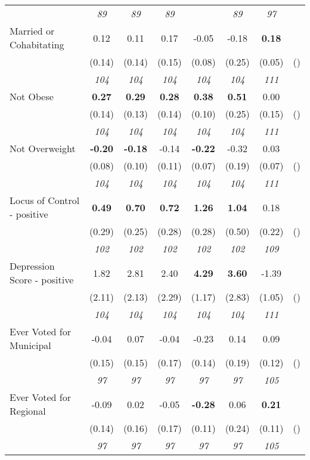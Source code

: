 \begin{tabular}{l c c c c c c c}
& \textit{ 89 } & \textit{ 89 } & \textit{ 89 } & & \textit{ 89 } & \textit{ 97 } & \\
Married or Cohabitating & 0.12 & 0.11 & 0.17 & -0.05 & -0.18 & \textbf{0.18} & \\
& (0.14) & (0.14) & (0.15) & (0.08) & (0.25) & (0.05) & () \\
& \textit{ 104 } & \textit{ 104 } & \textit{ 104 } & \textit{ 104 } & \textit{ 104 } & \textit{ 111 } & \\
Not Obese & \textbf{ 0.27 } & \textbf{ 0.29 } & \textbf{ 0.28 } & \textbf{0.38} & \textbf{0.51} & 0.00 & \\
& (0.14) & (0.13) & (0.14) & (0.10) & (0.25) & (0.15) & () \\
& \textit{ 104 } & \textit{ 104 } & \textit{ 104 } & \textit{ 104 } & \textit{ 104 } & \textit{ 111 } & \\
Not Overweight & \textbf{ -0.20 } & \textbf{ -0.18 } & -0.14 & \textbf{-0.22} & -0.32 & 0.03 & \\
& (0.08) & (0.10) & (0.11) & (0.07) & (0.19) & (0.07) & () \\
& \textit{ 104 } & \textit{ 104 } & \textit{ 104 } & \textit{ 104 } & \textit{ 104 } & \textit{ 111 } & \\
Locus of Control - positive & \textbf{ 0.49 } & \textbf{ 0.70 } & \textbf{ 0.72 } & \textbf{1.26} & \textbf{1.04} & 0.18 & \\
& (0.29) & (0.25) & (0.28) & (0.28) & (0.50) & (0.22) & () \\
& \textit{ 102 } & \textit{ 102 } & \textit{ 102 } & \textit{ 102 } & \textit{ 102 } & \textit{ 109 } & \\
Depression Score - positive & 1.82 & 2.81 & 2.40 & \textbf{4.29} & \textbf{3.60} & -1.39 & \\
& (2.11) & (2.13) & (2.29) & (1.17) & (2.83) & (1.05) & () \\
& \textit{ 104 } & \textit{ 104 } & \textit{ 104 } & \textit{ 104 } & \textit{ 104 } & \textit{ 111 } & \\
Ever Voted for Municipal & -0.04 & 0.07 & -0.04 & -0.23 & 0.14 & 0.09 & \\
& (0.15) & (0.15) & (0.17) & (0.14) & (0.19) & (0.12) & () \\
& \textit{ 97 } & \textit{ 97 } & \textit{ 97 } & \textit{ 97 } & \textit{ 97 } & \textit{ 105 } & \\
Ever Voted for Regional & -0.09 & 0.02 & -0.05 & \textbf{-0.28} & 0.06 & \textbf{0.21} & \\
& (0.14) & (0.16) & (0.17) & (0.11) & (0.24) & (0.11) & () \\
& \textit{ 97 } & \textit{ 97 } & \textit{ 97 } & \textit{ 97 } & \textit{ 97 } & \textit{ 105 } & \\
\bottomrule
\end{tabular}
